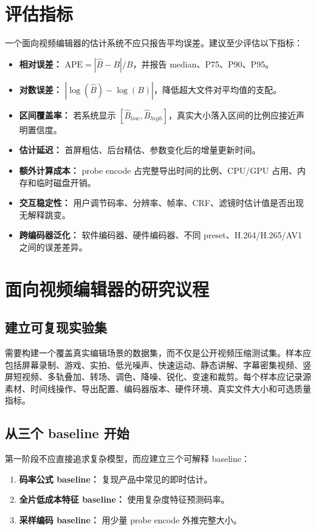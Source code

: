 \documentclass[UTF8,a4paper,11pt]{ctexart}
\begin{document}
\section{评估指标}

一个面向视频编辑器的估计系统不应只报告平均误差。建议至少评估以下指标：

\begin{itemize}
  \item \textbf{相对误差：} $\mathrm{APE}=|\hat{B}-B|/B$，并报告 median、P75、P90、P95。
  \item \textbf{对数误差：} $|\log(\hat{B})-\log(B)|$，降低超大文件对平均值的支配。
  \item \textbf{区间覆盖率：} 若系统显示 $[\hat{B}_{low}, \hat{B}_{high}]$，真实大小落入区间的比例应接近声明置信度。
  \item \textbf{估计延迟：} 首屏粗估、后台精估、参数变化后的增量更新时间。
  \item \textbf{额外计算成本：} probe encode 占完整导出时间的比例、CPU/GPU 占用、内存和临时磁盘开销。
  \item \textbf{交互稳定性：} 用户调节码率、分辨率、帧率、CRF、滤镜时估计值是否出现无解释跳变。
  \item \textbf{跨编码器泛化：} 软件编码器、硬件编码器、不同 preset、H.264/H.265/AV1 之间的误差差异。
\end{itemize}

\section{面向视频编辑器的研究议程}

\subsection{建立可复现实验集}

需要构建一个覆盖真实编辑场景的数据集，而不仅是公开视频压缩测试集。样本应包括屏幕录制、游戏、实拍、低光噪声、快速运动、静态讲解、字幕密集视频、竖屏短视频、多轨叠加、转场、调色、降噪、锐化、变速和裁剪。每个样本应记录源素材、时间线操作、导出配置、编码器版本、硬件环境、真实文件大小和可选质量指标。

\subsection{从三个 baseline 开始}

第一阶段不应直接追求复杂模型，而应建立三个可解释 baseline：

\begin{enumerate}
  \item \textbf{码率公式 baseline：} 复现产品中常见的即时估计。
  \item \textbf{全片低成本特征 baseline：} 使用复杂度特征预测码率。
  \item \textbf{采样编码 baseline：} 用少量 probe encode 外推完整大小。
\end{enumerate}
\end{document}
